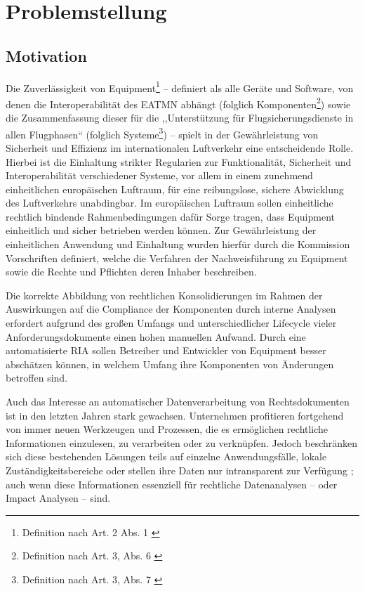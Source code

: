 \chapter{Problemstellung}
    \section{Motivation}

        Die Zuverlässigkeit von \atmans{} Equipment\footnote{Definition nach  Art. 2 Abs. 1 \cite{2023R1769}}  -- definiert als alle Geräte und Software, von denen die Interoperabilität des \ac{EATMN} abhängt (folglich \atmans{} Komponenten\footnote{Definition nach  Art. 3, Abs. 6 \cite{2018R1139}})  sowie die Zusammenfassung dieser für die ,,Unterstützung für Flugsicherungsdienste in allen Flugphasen`` (folglich \atmans{} Systeme\footnote{Definition nach  Art. 3, Abs. 7 \cite{2018R1139}}) -- spielt in der Gewährleistung von Sicherheit und Effizienz im internationalen Luftverkehr eine entscheidende Rolle. 
        Hierbei ist die Einhaltung strikter Regularien zur Funktionalität, Sicherheit und Interoperabilität verschiedener Systeme, vor allem in einem zunehmend einheitlichen europäischen Luftraum, für eine reibungslose, sichere Abwicklung des Luftverkehrs unabdingbar. 
        Im europäischen Luftraum sollen einheitliche rechtlich bindende Rahmenbedingungen dafür Sorge tragen, dass \atmans{} Equipment einheitlich und sicher betrieben werden können.
        Zur Gewährleistung der einheitlichen Anwendung und Einhaltung wurden hierfür durch die Kommission Vorschriften definiert, welche die Verfahren der Nachweisführung zu \atmans{} Equipment sowie die Rechte und Pflichten deren Inhaber beschreiben. \cite[Art. 43]{2018R1139} 
            
        Die korrekte Abbildung von rechtlichen Konsolidierungen im Rahmen der Auswirkungen auf die Compliance der \atmans{} Komponenten durch interne Analysen erfordert aufgrund des großen Umfangs und unterschiedlicher Lifecycle vieler Anforderungsdokumente einen hohen manuellen Aufwand.
        Durch eine automatisierte \ac{RIA} sollen Betreiber und Entwickler von \atmans{} Equipment besser abschätzen können, in welchem Umfang ihre Komponenten von Änderungen betroffen sind. 

    Auch das Interesse an automatischer Datenverarbeitung von Rechtsdokumenten ist in den letzten Jahren stark gewachsen.
    Unternehmen profitieren fortgehend von immer neuen Werkzeugen und Prozessen, die es ermöglichen rechtliche Informationen einzulesen, zu verarbeiten oder zu verknüpfen.
    Jedoch beschränken sich diese bestehenden Lösungen teils auf einzelne Anwendungsfälle, lokale Zuständigkeitsbereiche oder stellen ihre Daten nur intransparent zur Verfügung \cite[385]{eu_open_legal_info}; auch wenn diese Informationen essenziell für rechtliche Datenanalysen -- oder Impact Analysen -- sind.
        
